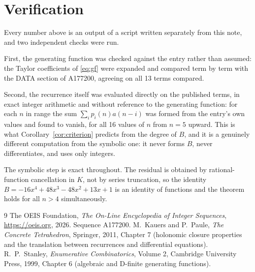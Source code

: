 \documentclass[11pt,a4paper]{article}
\theoremstyle{plain}
\theoremstyle{definition}
\begin{document}
\section{Verification}

Every number above is an output of a script written separately from this note, and two
independent checks were run.

First, the generating function was checked against the entry rather than assumed: the
Taylor coefficients of \eqref{eq:gf} were expanded and compared term by term with the DATA
section of A177200, agreeing on all 13 terms compared.

Second, the recurrence itself was evaluated directly on the published terms, in exact
integer arithmetic and without reference to the generating function: for each $n$ in range
the sum $\sum_{i}p_{i}(n)a(n-i)$ was formed from the entry's own values and found to
vanish, for all 16 values of $n$ from $n=5$ upward. This is what
Corollary~\ref{cor:criterion} predicts from the degree of $B$, and it is a genuinely
different computation from the symbolic one: it never forms $B$, never differentiates, and
uses only integers.

The symbolic step is exact throughout. The residual is obtained by rational-function
cancellation in $K$, not by series truncation, so the identity $B=- 16 x^{4} + 48 x^{3} - 48 x^{2} + 13 x + 1$ is an
identity of functions and the theorem holds for all $n>4$ simultaneously.

\begin{thebibliography}{9}
 The OEIS Foundation, \emph{The On-Line Encyclopedia of Integer Sequences},
\url{https://oeis.org}, 2026. Sequence A177200.
 M.~Kauers and P.~Paule, \emph{The Concrete Tetrahedron}, Springer, 2011,
Chapter 7 (holonomic closure properties and the translation between recurrences and
differential equations).
 R.~P.~Stanley, \emph{Enumerative Combinatorics}, Volume 2, Cambridge
University Press, 1999, Chapter 6 (algebraic and D-finite generating functions).
\end{thebibliography}
\end{document}
